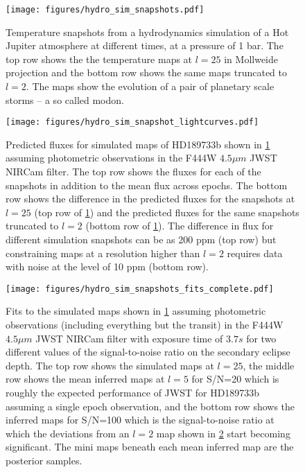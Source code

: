 \documentclass[modern]{aastex631}
\begin{document}
\begin{figure}[t!]
    \begin{centering}
    \texttt{[image: figures/hydro\_sim\_snapshots.pdf]}
    \caption{
       Temperature snapshots from a hydrodynamics simulation of a Hot Jupiter atmosphere at different times, at a pressure of 
       1 bar. 
       The top row shows the the temperature maps at $l=25$ in  Mollweide projection and the bottom row shows the same maps truncated 
       to $l=2$. 
       The maps show the evolution of a pair of planetary scale storms -- a so called modon.
    }
    \label{fig:hydro_sim_snapshots:maps}
    \end{centering}
\end{figure}

\begin{figure}[t!]
    \begin{centering}
    \texttt{[image: figures/hydro\_sim\_snapshot\_lightcurves.pdf]}
    \caption{
        Predicted fluxes for simulated maps of HD189733b shown in \ref{fig:hydro_sim_snapshots:maps} assuming photometric observations 
        in the F444W $4.5\mu m$ JWST NIRCam filter.
        The top row shows the fluxes for each of the snapshots in addition to the mean flux across epochs. 
        The bottom row shows the difference in the predicted fluxes for the snapshots at $l=25$ (top row of 
        \ref{fig:hydro_sim_snapshots:maps}) and the predicted fluxes for the same snapshots truncated to $l=2$ (bottom row of 
        \ref{fig:hydro_sim_snapshots:maps}).
        The difference in flux for different simulation snapshots can be as 200 ppm (top row) but constraining maps 
        at a resolution higher than $l=2$ requires data with noise at the level of 10 ppm (bottom row). 
    }
    \label{fig:hydro_sim_snapshots:lightcurves}
    \end{centering}
\end{figure}

\begin{figure}[t!]
    \begin{centering}
    \texttt{[image: figures/hydro\_sim\_snapshots\_fits\_complete.pdf]}
    \caption{
        Fits to the simulated maps shown in \ref{fig:hydro_sim_snapshots:maps} assuming photometric observations
        (including everything but the transit) in the F444W $4.5\mu m$ JWST NIRCam filter with exposure time of $3.7 s$ for two different values 
        of the signal-to-noise ratio on the secondary eclipse depth. 
        The top row shows the simulated maps at $l=25$, the middle row shows the mean inferred maps at $l=5$
        for S/N=20 which is roughly the expected performance of JWST for HD189733b assuming a single epoch
        observation, and the bottom row shows the inferred maps for S/N=100 which is the signal-to-noise ratio
        at which the deviations from an $l=2$ map shown in \ref{fig:hydro_sim_snapshots:lightcurves} start
        becoming significant.
        The mini maps beneath each mean inferred map are the posterior samples. 
    }
    \label{fig:hydro_sim_snapshots_fits:complete}
    \end{centering}
\end{figure}
\end{document}

